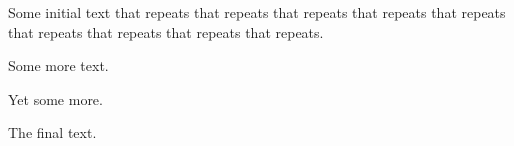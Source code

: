 \documentclass{article}
\begin{document}
Some initial text that repeats that repeats that repeats that repeats
that repeats that repeats that repeats that repeats that repeats.

Some more text.


Yet some more.

The final text.
\end{document}
